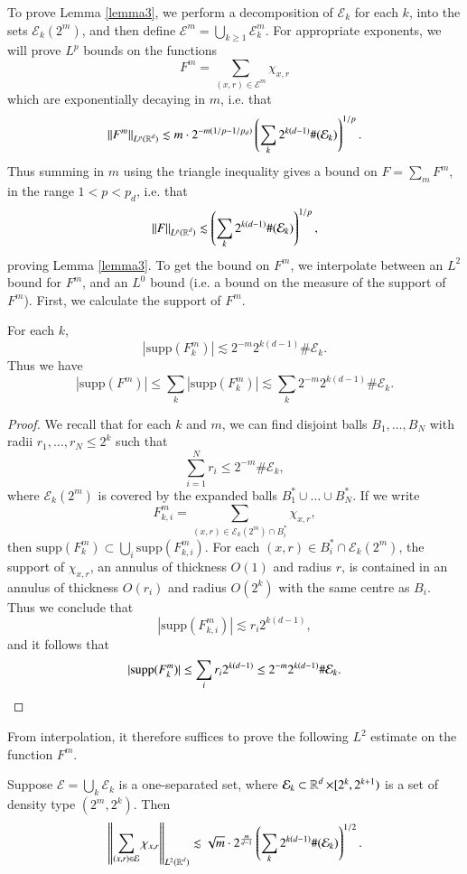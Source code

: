 To prove Lemma \ref{lemma3}, we perform a decomposition of $\mathcal{E}_k$ for each $k$, into the sets $\mathcal{E}_k(2^m)$, and then define $\mathcal{E}^m = \bigcup_{k \geq 1} \mathcal{E}_k^m$. For appropriate exponents, we will prove $L^p$ bounds on the functions
%
\[ F^m = \sum_{(x,r) \in \mathcal{E}^m} \chi_{x,r} \]
%
which are exponentially decaying in $m$, i.e. that
%
\[ \| F^m \|_{L^p(\operatorname{\mathbb{R}}^d)} \lesssim m \cdot 2^{-m(1/p - 1/p_d)} \left( \sum_k 2^{k(d-1)} \#(\mathcal{E}_k) \right)^{1/p}. \]
%
Thus summing in $m$ using the triangle inequality gives a bound on $F = \sum_m F^m$, in the range $1 < p < p_d$, i.e. that
%
\[ \| F \|_{L^p(\operatorname{\mathbb{R}}^d)} \lesssim \left( \sum_k 2^{k(d-1)} \#(\mathcal{E}_k) \right)^{1/p}, \]
%
proving Lemma \ref{lemma3}. To get the bound on $F^m$, we interpolate between an $L^2$ bound for $F^m$, and an $L^0$ bound (i.e. a bound on the measure of the support of $F^m$). First, we calculate the support of $F^m$.

\begin{lemma} \label{lemma5}
    For each $k$,
    \[ |\text{supp}(F^m_k)| \lesssim 2^{-m} 2^{k(d-1)} \# \mathcal{E}_k. \]
    Thus we have
    \[ |\text{supp}(F^m)| \leq \sum_k |\text{supp}(F^m_k)| \lesssim \sum_k 2^{-m} 2^{k(d-1)} \# \mathcal{E}_k. \]
\end{lemma}
\begin{proof}
    We recall that for each $k$ and $m$, we can find disjoint balls $B_1,\dots,B_N$ with radii $r_1,\dots,r_N \leq 2^k$ such that
    \[ \sum_{i = 1}^N r_i \leq 2^{-m} \# \mathcal{E}_k, \]
    where $\mathcal{E}_k(2^m)$ is covered by the expanded balls $B_1^* \cup \dots \cup B_N^*$. If we write
    \[ F^m_{k,i} = \sum_{(x,r) \in \mathcal{E}_k(2^m) \cap B_i^*} \chi_{x,r}, \]
    then $\text{supp}(F^m_k) \subset \bigcup_i \text{supp}(F^m_{k,i})$. For each $(x,r) \in B_i^* \cap \mathcal{E}_k(2^m)$, the support of $\chi_{x,r}$, an annulus of thickness $O(1)$ and radius $r$, is contained in an annulus of thickness $O(r_i)$ and radius $O(2^k)$ with the same centre as $B_i$. Thus we conclude that
    \[ |\text{supp}(F^m_{k,i})| \lesssim r_i 2^{k(d-1)}, \]
    and it follows that
    \[ |\text{supp}(F^m_k)| \leq \sum_i r_i 2^{k(d-1)} \leq 2^{-m} 2^{k(d-1)} \# \mathcal{E}_k. \qedhere \]
\end{proof}

From interpolation, it therefore suffices to prove the following $L^2$ estimate on the function $F^m$.

\begin{lemma} \label{lemma6}
    Suppose $\mathcal{E} = \bigcup_k \mathcal{E}_k$ is a one-separated set, where $\mathcal{E}_k \subset \operatorname{\mathbb{R}}^d \times [2^k,2^{k+1})$ is a set of density type $(2^m, 2^k)$. Then
    \[ \left\| \sum_{(x,r) \in \mathcal{E}} \chi_{x,r} \right\|_{L^2(\operatorname{\mathbb{R}}^d)} \lesssim \sqrt{m} \cdot 2^{ \frac{m}{d-1} } \left( \sum_k 2^{k(d-1)} \#(\mathcal{E}_k) \right)^{1/2}. \]
\end{lemma}

